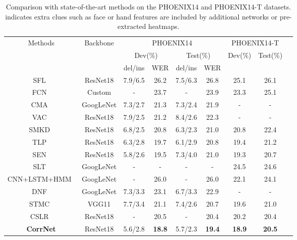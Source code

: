 \documentclass[10pt,twocolumn,letterpaper]{article}
\begin{document}
\begin{table*}[t]   
  \centering
  \setlength\tabcolsep{3pt}
  \begin{tabular}{ccccccccc}
  \hline
  \multirow{3}{*}{Methods} &\multirow{3}{*}{Backbone} & \multicolumn{4}{c}{PHOENIX14} & \multicolumn{2}{c}{PHOENIX14-T} \\
  & &\multicolumn{2}{c}{Dev(\%)} & \multicolumn{2}{c}{Test(\%)} &  \multirow{2}{*}{Dev(\%)} & \multirow{2}{*}{Test(\%)}\\
  & &del/ins & WER & del/ins& WER & & \\
  \hline
SFL~\cite{niu2020stochastic}& ResNet18 & 7.9/6.5 & 26.2 & 7.5/6.3& 26.8 & 25.1&26.1\\
FCN~\cite{cheng2020fully}& Custom & - & 23.7 & -& 23.9 & 23.3& 25.1\\
  CMA~\cite{pu2020boosting} & GoogLeNet & 7.3/2.7 & 21.3 & 7.3/2.4 & 21.9  & -&-\\
  VAC~\cite{Min_2021_ICCV}& ResNet18 & 7.9/2.5 & 21.2 &8.4/2.6 & 22.3 &- &-\\
  SMKD~\cite{hao2021self}& ResNet18 &6.8/2.5 &20.8 &6.3/2.3 & 21.0 & 20.8 & 22.4\\
  TLP~\cite{hu2022temporal} & ResNet18 & 6.3/2.8 & 19.7 & 6.1/2.9 & 20.8 & 19.4  & 21.2 \\
  SEN~\cite{hu2023self} & ResNet18 & 5.8/2.6 &  19.5 &  7.3/4.0 &  21.0 &  19.3 &  20.7 \\
  \hline
  SLT~\cite{camgoz2018neural}& GoogLeNet  & - & - & - & - & 24.5 & 24.6\\
  CNN+LSTM+HMM~\cite{koller2019weakly}& GoogLeNet  & - &26.0 & - & 26.0 & 22.1 & 24.1 \\
  DNF~\cite{cui2019deep}& GoogLeNet  & 7.3/3.3 &23.1& 6.7/3.3 & 22.9 & - & -\\
  STMC~\cite{zhou2020spatial}& VGG11 & 7.7/3.4 &21.1 & 7.4/2.6 & 20.7 & 19.6 & 21.0\\
  CSLR~\cite{zuo2022c2slr} & ResNet18 & - & 20.5 &- & 20.4 & 20.2 & 20.4  \\
  \hline
\textbf{CorrNet } & ResNet18 & 5.6/2.8  &\textbf{18.8} &   5.7/2.3 & \textbf{19.4}  & \textbf{18.9} & \textbf{20.5} \\
  \hline   
  \end{tabular}  
  \caption{Comparison with state-of-the-art methods on the PHOENIX14 and PHOENIX14-T datasets.  indicates extra clues such as face or hand features are included by additional networks or pre-extracted heatmaps.} 
  \label{tab8}
\end{table*}
\end{document}
